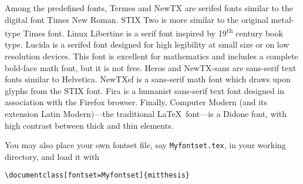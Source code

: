 \documentclass[11pt]{article}
\begin{document}
Among the predefined fonts, Termes and NewTX are serifed fonts similar to the digital font Times New Roman.  STIX Two is more similar to the original metal-type Times font. Linux Libertine is a serif font inspired by 19\textsuperscript{th} century book type. Lucida is a serifed font designed for high legibility at small size or on low resolution devices. This font is excellent for mathematics and includes a complete bold-face math font, but it is not free. Heros and NewTX-sans are sans-serif text fonts similar to Helvetica. NewTXsf is a sans-serif math font which draws upon glyphs from the STIX font. Fira is a humanist sans-serif text font designed in association with the Firefox browser. Finally, Computer Modern (and its extension Latin Modern)---the traditional \LaTeX\ font---is a Didone font, with high contrast between thick and thin elements.

You may also place your own fontset file, say \texttt{Myfontset.tex}, in your working directory, and load it with

\vskip10pt
\hfill\verb|\documentclass[fontset=Myfontset]{mitthesis}|\hfill\hbox{}
\end{document}

